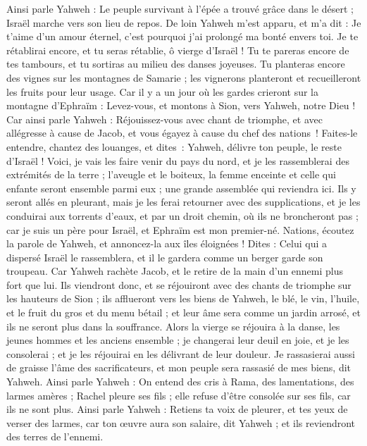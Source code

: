 \begin{multicols}{2}
Ainsi parle Yahweh : Le peuple survivant à l'épée a trouvé grâce dans le désert ; Israël marche vers son lieu de repos.
De loin Yahweh m'est apparu, et m'a dit : Je t'aime d'un amour éternel, c'est pourquoi j'ai prolongé ma bonté envers toi.
Je te rétablirai encore, et tu seras rétablie, ô vierge d'Israël ! Tu te pareras encore de tes tambours, et tu sortiras au milieu des danses joyeuses.
Tu planteras encore des vignes sur les montagnes de Samarie ; les vignerons planteront et recueilleront les fruits pour leur usage.
Car il y a un jour où les gardes crieront sur la montagne d'Ephraïm : Levez-vous, et montons à Sion, vers Yahweh, notre Dieu !
Car ainsi parle Yahweh : Réjouissez-vous avec chant de triomphe, et avec allégresse à cause de Jacob, et vous égayez à cause du chef des nations ! Faites-le entendre, chantez des louanges, et dites : Yahweh, délivre ton peuple, le reste d’Israël !
Voici, je vais les faire venir du pays du nord, et je les rassemblerai des extrémités de la terre ; l'aveugle et le boiteux, la femme enceinte et celle qui enfante seront ensemble parmi eux ; une grande assemblée qui reviendra ici.
Ils y seront allés en pleurant, mais je les ferai retourner avec des supplications, et je les conduirai aux torrents d'eaux, et par un droit chemin, où ils ne broncheront pas ; car je suis un père pour Israël, et Ephraïm est mon premier-né.
Nations, écoutez la parole de Yahweh, et annoncez-la aux îles éloignées ! Dites : Celui qui a dispersé Israël le rassemblera, et il le gardera comme un berger garde son troupeau.
Car Yahweh rachète Jacob, et le retire de la main d'un ennemi plus fort que lui.
Ils viendront donc, et se réjouiront avec des chants de triomphe sur les hauteurs de Sion ; ils afflueront vers les biens de Yahweh, le blé, le vin, l'huile, et le fruit du gros et du menu bétail ; et leur âme sera comme un jardin arrosé, et ils ne seront plus dans la souffrance.
Alors la vierge se réjouira à la danse, les jeunes hommes et les anciens ensemble ; je changerai leur deuil en joie, et je les consolerai ; et je les réjouirai en les délivrant de leur douleur.
Je rassasierai aussi de graisse l'âme des sacrificateurs, et mon peuple sera rassasié de mes biens, dit Yahweh.
Ainsi parle Yahweh : On entend des cris à Rama, des lamentations, des larmes amères ; Rachel pleure ses fils ; elle refuse d'être consolée sur ses fils, car ils ne sont plus.
Ainsi parle Yahweh : Retiens ta voix de pleurer, et tes yeux de verser des larmes, car ton œuvre aura son salaire, dit Yahweh ; et ils reviendront des terres de l'ennemi.

\end{multicols}
